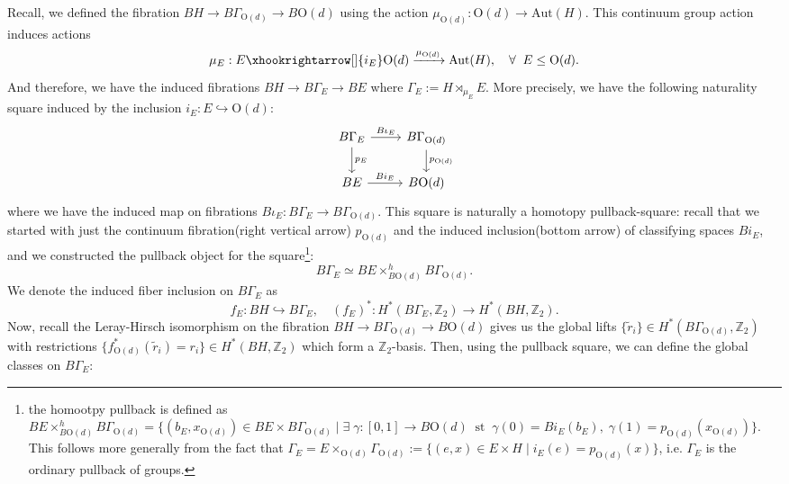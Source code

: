 \documentclass[aps,prx,reprint,superscriptaddress,twocolumn,amsmath,amssymb,amsfonts, nofootinbib]{revtex4-2}
\newcommand{\Z}{\mathbb{Z}}
\theoremstyle{apsstyle}
\begin{document}
\bigskip

\noindent Recall, we defined the fibration $BH\to B\Gamma_{\mathrm{O}(d)}\to B\mathrm{O}(d)$ using the action $\mu_{\mathrm{O}(d)}: \mathrm{O}(d)\to \mathrm{Aut}(H)$. This continuum group action induces actions 
\begin{equation*}
    \mu_{E}: E \xhookrightarrow[]{i_{E}} \mathrm{O}(d)\xrightarrow[]{\mu_{\mathrm{O}(d)}} \mathrm{Aut}(H),\quad \forall\;\; E\leq \mathrm{O}(d).
\end{equation*}
And therefore, we have the induced fibrations $BH \to B\Gamma_{E} \to BE$ where $\Gamma_{E}:= H\rtimes_{\mu_{E}}E$. More precisely, we have the following naturality square induced by the inclusion $i_E: E\hookrightarrow \mathrm{O}(d)$:
\begin{equation*}
    \begin{tikzcd}
        B\Gamma_{E} \arrow[r, "B\iota_{E}"] \arrow[d, "p_{E}"] & B\Gamma_{\mathrm{O}(d)} \arrow[d, "p_{\mathrm{O}(d)}"]\\
        BE \arrow[r, "Bi_{E}"] & B\mathrm{O}(d)
    \end{tikzcd}
\end{equation*}
where we have the induced map on fibrations $B\iota_{E}: B\Gamma_{E}\to B\Gamma_{\mathrm{O}(d)}$. This square is naturally a homotopy pullback-square: recall that we started with just the continuum fibration(right vertical arrow) $p_{\mathrm{O}(d)}$ and the induced inclusion(bottom arrow) of classifying spaces $Bi_{E}$, and we constructed the pullback object for the square\footnote{the homootpy pullback is defined as $BE\times^{h}_{B\mathrm{O}(d)}B\Gamma_{\mathrm{O}(d)}=\{(b_E, x_{\mathrm{O}(d)})\in BE \times B\Gamma_{\mathrm{O}(d)}\;|\; \exists\;\gamma: [0,1] \to B\mathrm{O}(d)\;\;\text{st}\;\; \gamma(0)=Bi_E(b_E),\; \gamma(1)=p_{\mathrm{O}(d)}(x_{\mathrm{O}(d)})\}$. This follows more generally from the fact that $\Gamma_{E}=E\times_{\mathrm{O}(d)}\Gamma_{\mathrm{O}(d)}:=\{(e,x)\in E\times H\;|\; i_{E}(e)=p_{\mathrm{O}(d)}(x)\}$, i.e. $\Gamma_{E}$ is the ordinary pullback of groups.}: 
\begin{equation*}
    B\Gamma_{E}\simeq BE\times^{h}_{B\mathrm{O}(d)}B\Gamma_{\mathrm{O}(d)}.
\end{equation*}
We denote the induced fiber inclusion on $B\Gamma_{E}$ as 
\begin{equation*}
    f_{E}: BH \hookrightarrow B\Gamma_{E}, \quad (f_{E})^{*}: H^{*}(B\Gamma_{E}, \Z_{2}) \to H^{*}(BH, \Z_{2}).
\end{equation*}
Now, recall the Leray-Hirsch isomorphism on the fibration $BH\to B\Gamma_{\mathrm{O}(d)}\to B\mathrm{O}(d)$ gives us the global lifts $\{\widetilde{r}_{i}\}\in H^{*}(B\Gamma_{\mathrm{O}(d)},\Z_{2})$ with restrictions $\{f_{\mathrm{O}(d)}^{*}(\widetilde{r}_{i})=r_{i}\}\in H^{*}(BH, \Z_{2})$ which form a $\Z_{2}$-basis. Then, using the pullback square, we can define the global classes on $B\Gamma_{E}$:
\end{document}

